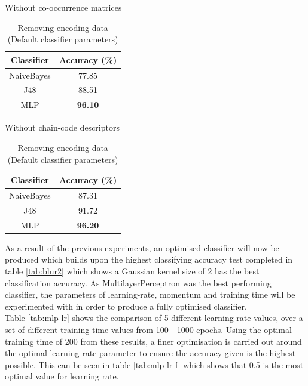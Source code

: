 \documentclass[12pt]{article}
\begin{document}
    \begin{table}[H]
      \begin{subtable}{.5\linewidth}
        \centering
        \caption{Without co-occurrence matrices}
        \begin{tabular}{c|c}
          \toprule
          \multicolumn{1}{c|}{Classifier} & \multicolumn{1}{c}{Accuracy (\%)} \\
          \midrule
          NaiveBayes & 77.85 \\
          J48   & 88.51 \\
          MLP   & \textbf{96.10} \\
          \bottomrule
        \end{tabular}%
        \label{tab:no-co-occur}%
      \end{subtable}
      \begin{subtable}{.5\linewidth}
        \centering
        \caption{Without chain-code descriptors}
        \begin{tabular}{c|c}
        \toprule
        Classifier & Accuracy (\%) \\
        \midrule
        NaiveBayes & 87.31 \\
        J48   & 91.72 \\
        MLP   & \textbf{96.20} \\
        \bottomrule
        \end{tabular}%
        \label{tab:no-chain-code}%
      \end{subtable}
      \caption{Removing encoding data (Default classifier parameters)}
      \label{tab:no-encoding}
    \end{table}
    As a result of the previous experiments, an optimised classifier will now be produced which builds upon the highest classifying accuracy test completed in table \ref{tab:blur2} which shows a Gaussian kernel size of 2 has the best classification accuracy. As MultilayerPerceptron was the best performing classifier, the parameters of learning-rate, momentum and training time will be experimented with in order to produce a fully optimised classifier.\\

    Table \ref{tab:mlp-lr} shows the comparison of 5 different learning rate values, over a set of different training time values from 100 - 1000 epochs. Using the optimal training time of 200 from these results, a finer optimisation is carried out around the optimal learning rate parameter to ensure the accuracy given is the highest possible. This can be seen in table \ref{tab:mlp-lr-f} which shows that 0.5 is the most optimal value for learning rate.
\end{document}
